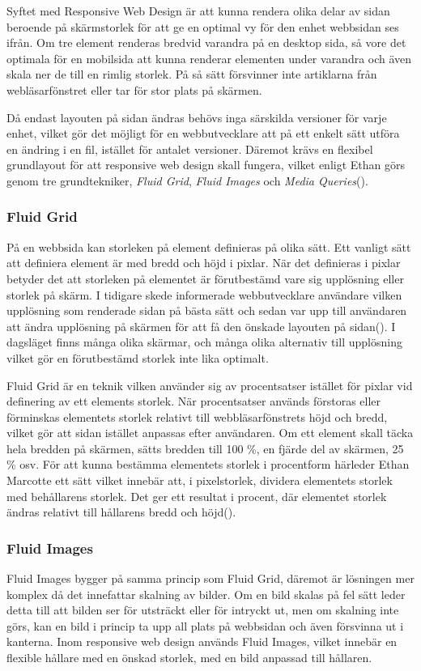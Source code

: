 \documentclass[11pt]{article}
\begin{document}
Syftet med Responsive Web Design är att kunna rendera olika delar av sidan beroende på skärmstorlek för att ge en optimal vy för den enhet webbsidan ses ifrån. Om tre element renderas bredvid varandra på en desktop sida, så vore det optimala för en mobilsida att kunna renderar elementen under varandra och även skala ner de till en rimlig storlek. På så sätt försvinner inte artiklarna från webläsarfönstret eller tar för stor plats på skärmen.

Då endast layouten på sidan ändras behövs inga särskilda versioner för varje enhet, vilket gör det möjligt för en webbutvecklare att på ett enkelt sätt utföra en ändring i en fil, istället för antalet versioner. Däremot krävs en flexibel grundlayout för att responsive web design skall fungera, vilket enligt Ethan görs genom tre grundtekniker, \textit{Fluid Grid}, \textit{Fluid Images} och \textit{Media Queries}(\cite{resp}).

\subsubsection{Fluid Grid}
På en webbsida kan storleken på element definieras på olika sätt. Ett vanligt sätt att definiera element är med bredd och höjd i pixlar. När det definieras i pixlar betyder det att storleken på elementet är förutbestämd vare sig upplösning eller storlek på skärm. I tidigare skede informerade webbutvecklare användare vilken upplösning som renderade sidan på bästa sätt och sedan var upp till användaren att ändra upplösning på skärmen för att få den önskade layouten på sidan(\cite[s. 6]{resp}). I dagsläget finns många olika skärmar, och många olika alternativ till upplösning vilket gör en förutbestämd storlek inte lika optimalt. 

Fluid Grid är en teknik vilken använder sig av procentsatser istället för pixlar vid definering av ett elements storlek. När procentsatser används förstoras eller förminskas elementets storlek relativt till webbläsarfönstrets höjd och bredd, vilket gör att sidan istället anpassas efter användaren. Om ett element skall täcka hela bredden på skärmen, sätts bredden till 100 \%, en fjärde del av skärmen, 25 \% osv. 
För att kunna bestämma elementets storlek i procentform härleder Ethan Marcotte ett sätt vilket innebär att, i pixelstorlek, dividera elementets storlek med behållarens storlek. Det ger ett resultat i procent, där elementet storlek ändras relativt till hållarens bredd och höjd(\cite[s. 23]{resp}).

\subsubsection{Fluid Images}
Fluid Images bygger på samma princip som Fluid Grid, däremot är lösningen mer komplex då det innefattar skalning av bilder. Om en bild skalas på fel sätt leder detta till att bilden ser för utsträckt eller för intryckt ut, men om skalning inte görs, kan en bild i princip ta upp all plats på webbsidan och även försvinna ut i kanterna. Inom responsive web design används Fluid Images, vilket innebär en flexible hållare med en önskad storlek, med en bild anpassad till hållaren.  
\end{document}
